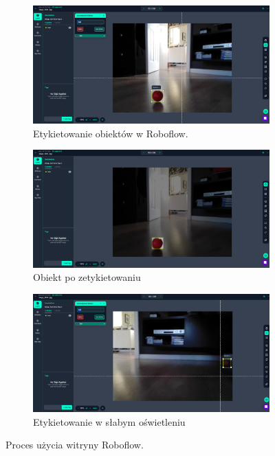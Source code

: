 \documentclass[a4paper,twoside,12pt]{book}
\begin{document}
\begin{figure}[h!]
    \centering

    \begin{subfigure}[b]{1\textwidth}
        \centering
        \includegraphics[width=1\textwidth]{Images/Roboflow/labeling1.png}
        \caption{Etykietowanie obiektów w Roboflow.}
        \label{fig:labeling1}
    \end{subfigure}
    
    \begin{subfigure}[b]{1\textwidth}
        \centering
        \includegraphics[width=1\textwidth]{Images/Roboflow/labeling2.png}
        \caption{Obiekt po zetykietowaniu}
        \label{fig:labeling2}
    \end{subfigure}
    
    \begin{subfigure}[b]{1\textwidth}
        \centering
        \includegraphics[width=1\textwidth]{Images/Roboflow/labeling3.png}
        \caption{Etykietowanie w słabym oświetleniu}
        \label{fig:labeling3}
    \end{subfigure}
    
    \caption{Proces użycia witryny Roboflow.}
    \label{fig:roboflow-process}
\end{figure}
\end{document}
